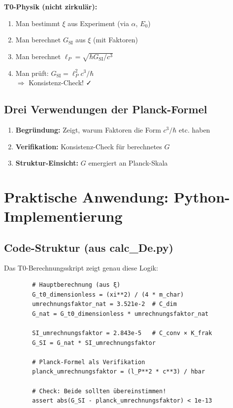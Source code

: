 	\textbf{T0-Physik (nicht zirkulär):}
	\begin{enumerate}
		\item Man bestimmt $\xi$ aus Experiment (via $\alpha$, $E_0$)
		\item Man berechnet $G_{\text{SI}}$ aus $\xi$ (mit Faktoren)
		\item Man berechnet $\ell_P = \sqrt{\hbar G_{\text{SI}} / c^3}$
		\item Man prüft: $G_{\text{SI}} = \ell_P^2 c^3 / \hbar$ \\
		$\Rightarrow$ Konsistenz-Check! ✓
	\end{enumerate}
	
	\subsection{Drei Verwendungen der Planck-Formel}
	
	\begin{enumerate}
		\item \textbf{Begründung:} Zeigt, warum Faktoren die Form $c^3/\hbar$ etc. haben
		
		\item \textbf{Verifikation:} Konsistenz-Check für berechnetes $G$
		
		\item \textbf{Struktur-Einsicht:} $G$ emergiert an Planck-Skala
	\end{enumerate}
	
	\section{Praktische Anwendung: Python-Implementierung}
	
	\subsection{Code-Struktur (aus calc\_De.py)}
	
	Das T0-Berechnungsskript zeigt genau diese Logik:
	
	\begin{verbatim}
		# Hauptberechnung (aus ξ)
		G_t0_dimensionless = (xi**2) / (4 * m_char)
		umrechnungsfaktor_nat = 3.521e-2  # C_dim
		G_nat = G_t0_dimensionless * umrechnungsfaktor_nat
		
		SI_umrechnungsfaktor = 2.843e-5   # C_conv × K_frak
		G_SI = G_nat * SI_umrechnungsfaktor
		
		# Planck-Formel als Verifikation
		planck_umrechnungsfaktor = (l_P**2 * c**3) / hbar
		
		# Check: Beide sollten übereinstimmen!
		assert abs(G_SI - planck_umrechnungsfaktor) < 1e-13
	\end{verbatim}
	
